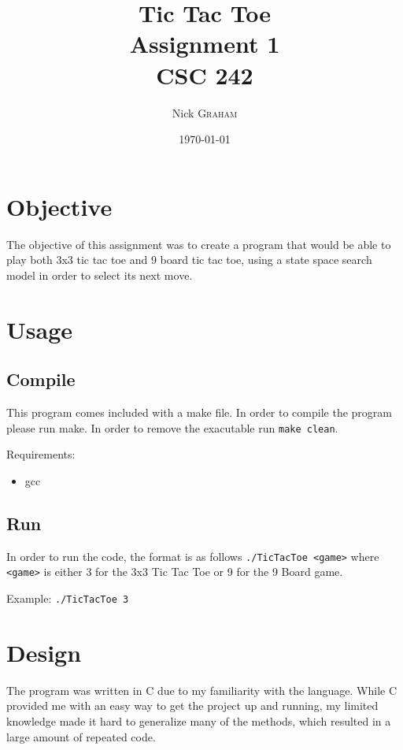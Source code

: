 \documentclass{article}
\title{Tic Tac Toe \\ Assignment 1 \\ CSC 242} %
\author{Nick \textsc{Graham}} %
\date{\today} %
\begin{document}
\maketitle %



\section{Objective}
The objective of this assignment was to create a program that would be able to play
both 3x3 tic tac toe and 9 board tic tac toe, using a state space search model in
order to select its next move.

\section{Usage}
\subsection{Compile}
This program comes included with a make file. In order to compile the program
please run make. In order to remove the exacutable run \texttt{make clean}.

Requirements:
\begin{itemize}
    \item gcc
\end{itemize}

\subsection{Run}
In order to run the code, the format is as follows \texttt{./TicTacToe <game>} where
\texttt{<game>} is either 3 for the 3x3 Tic Tac Toe or 9 for the 9 Board game.

Example: \texttt{./TicTacToe 3}

\section{Design}
The program was written in C due to my familiarity with the language. While C
provided me with an easy way to get the project up and running, my limited knowledge
made it hard to generalize many of the methods, which resulted in a large amount
of repeated code.
\end{document}
